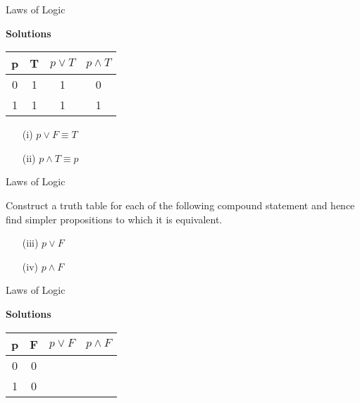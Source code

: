 {Laws of Logic}

\textbf{Solutions}
\begin{center}

\begin{tabular}{|c|c||c||c|}
\hline  \phantom{sp}p\phantom{sp}&  \phantom{sp}T\phantom{sp}& $p \vee T$ & $ p \wedge T$ \\ \hline
\hline  0 & 1 & 1 & 0 \\ 
\hline  1 &  1 & 1 & 1 \\ 
\hline 
\end{tabular} 
\end{center}
\begin{itemize}
\item[(i)] $p \vee F \equiv T$
\item[(ii)] $p \wedge T \equiv p$
\end{itemize}




{Laws of Logic}

Construct a truth table for each of the following compound statement and hence find simpler propositions to which it is equivalent.


\begin{itemize}
\item[(iii)] $p \vee F$
\item[(iv)] $p \wedge F$
\end{itemize}


{Laws of Logic}

\textbf{Solutions}
\begin{center}

\begin{tabular}{|c|c||c|c|}
\hline  \phantom{sp}p\phantom{sp}&  \phantom{sp}F\phantom{sp}& $p \vee F$ & $ p \wedge F$ \\ \hline
\hline  0 & 0 &  &  \\ 
\hline  1 &  0 &  &  \\ 
\hline 
\end{tabular} 

\end{center}


